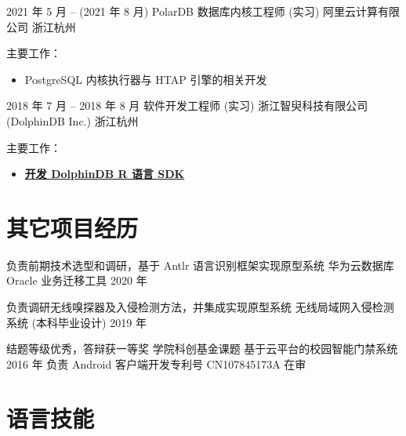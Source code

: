 \documentclass[11pt,a4paper,sans]{moderncv}   %
\begin{document}
\begin{CJK}{UTF8}{gbsn}
\cventry
{2021 年 5 月 -- (2021 年 8 月)}
{PolarDB 数据库内核工程师 (实习)}
{阿里云计算有限公司}
{浙江杭州}
{}{主要工作：
\begin{itemize}%
  \item PostgreSQL 内核执行器与 HTAP 引擎的相关开发
\end{itemize}}

\cventry
{2018 年 7 月 -- 2018 年 8 月}
{软件开发工程师 (实习)}
{浙江智臾科技有限公司 (DolphinDB Inc.)}
{浙江杭州}
{}{主要工作：
\begin{itemize}%
  \item \textbf{
    \href{https://github.com/dolphindb/api-r}{开发 DolphinDB R 语言 SDK}
  }
\end{itemize}}


\section{其它项目经历}

\cventry{}
{负责前期技术选型和调研，基于 Antlr 语言识别框架实现原型系统}
{华为云数据库 Oracle 业务迁移工具}
{2020 年}{}{}

\cventry{}
{负责调研无线嗅探器及入侵检测方法，并集成实现原型系统}
{无线局域网入侵检测系统 (本科毕业设计)}
{2019 年}{}{
}

\cventry
{结题等级优秀，答辩获一等奖}
{学院科创基金课题}
{基于云平台的校园智能门禁系统}
{2016 年}
{负责 Android 客户端开发}{专利号 CN107845173A 在审}

\section{语言技能}


\end{CJK}
\end{document}
